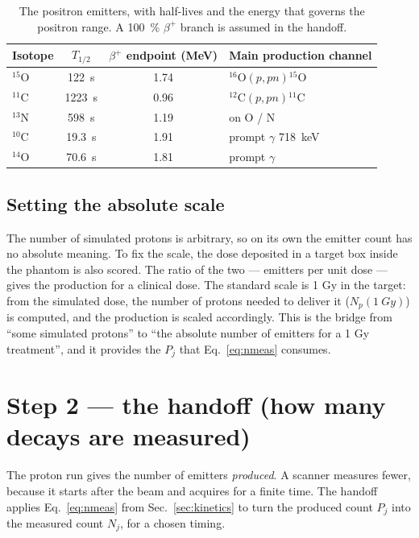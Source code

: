 \documentclass[11pt]{article}
\newcommand{\bplus}{\beta^{+}}
\newcommand{\Cl}[1]{{}^{#1}\mathrm{C}}
\newcommand{\Ox}[1]{{}^{#1}\mathrm{O}}
\newcommand{\Nt}[1]{{}^{#1}\mathrm{N}}
\begin{document}
\begin{table}[h]
\centering
\caption{The positron emitters, with half-lives and the energy that governs the
positron range. A \SI{100}{\percent} $\bplus$ branch is assumed in the handoff.}
\label{tab:iso}
\begin{tabular}{lccl}
\toprule
Isotope & $T_{1/2}$ & $\bplus$ endpoint (MeV) & Main production channel \\
\midrule
$\Ox{15}$ & \SI{122}{s}   & 1.74 & $\Ox{16}(p,pn)\Ox{15}$ \\
$\Cl{11}$ & \SI{1223}{s}  & 0.96 & $\Cl{12}(p,pn)\Cl{11}$ \\
$\Nt{13}$ & \SI{598}{s}   & 1.19 & on O / N \\
$\Cl{10}$ & \SI{19.3}{s}  & 1.91 & prompt $\gamma$ \SI{718}{keV} \\
$\Ox{14}$ & \SI{70.6}{s}  & 1.81 & prompt $\gamma$ \\
\bottomrule
\end{tabular}
\end{table}

\subsection{Setting the absolute scale}
\label{sec:norm}
The number of simulated protons is arbitrary, so on its own the emitter count has
no absolute meaning. To fix the scale, the dose deposited in a target box
inside the phantom is also scored. The ratio of the two --- emitters per unit dose ---
gives the production for a clinical dose. The standard scale is 1 Gy in the target:
from the simulated dose, the number of protons needed to deliver it
($N_p(\SI{1}{Gy})$) is computed, and the production is scaled accordingly. This is the bridge from
``some simulated protons'' to ``the absolute number of emitters for a 1 Gy
treatment'', and it provides the $P_j$ that Eq.~\eqref{eq:nmeas} consumes.

\section{Step 2 --- the handoff (how many decays are measured)}
\label{sec:handoff}

The proton run gives the number of emitters \emph{produced}. A scanner measures
fewer, because it starts after the beam and acquires for a finite time. The handoff
applies Eq.~\eqref{eq:nmeas} from Sec.~\ref{sec:kinetics} to turn the produced count
$P_j$ into the measured count $N_j$, for a chosen timing.
\end{document}
